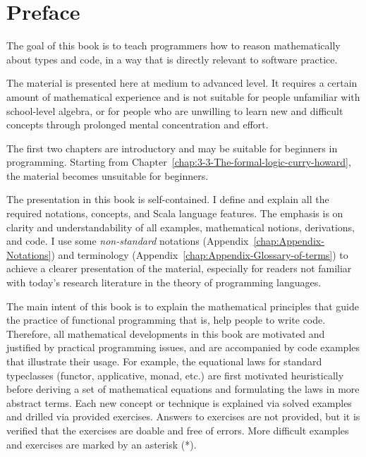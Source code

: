 
\chapter*{Preface}


The goal of this book is to teach programmers how to reason mathematically
about types and code, in a way that is directly relevant to software
practice.

The material is presented here at medium to advanced level. It requires
a certain amount of mathematical experience and is not suitable for
people unfamiliar with school-level algebra, or for people who are
unwilling to learn new and difficult concepts through prolonged mental
concentration and effort.

The first two chapters are introductory and may be suitable for beginners
in programming. Starting from Chapter~\ref{chap:3-3-The-formal-logic-curry-howard},
the material becomes unsuitable for beginners. 

The presentation in this book is self-contained. I define and explain
all the required notations, concepts, and Scala language features.
The emphasis is on clarity and understandability of all examples,
mathematical notions, derivations, and code. I use some \emph{non-standard}
notations (Appendix~\ref{chap:Appendix-Notations}) and terminology
(Appendix~\ref{chap:Appendix-Glossary-of-terms}) to achieve a clearer
presentation of the material, especially for readers not familiar
with today's research literature in the theory of programming languages.

The main intent of this book is to explain the mathematical principles
that guide the practice of functional programming \textendash{} that
is, help people to write code. Therefore, all mathematical developments
in this book are motivated and justified by practical programming
issues, and are accompanied by code examples that illustrate their
usage. For example, the equational laws for standard typeclasses (functor,
applicative, monad, etc.) are first motivated heuristically before
deriving a set of mathematical equations and formulating the laws
in more abstract terms. Each new concept or technique is explained
via solved examples and drilled via provided exercises. Answers to
exercises are not provided, but it is verified that the exercises
are doable and free of errors. More difficult examples and exercises
are marked by an asterisk ({*}).

